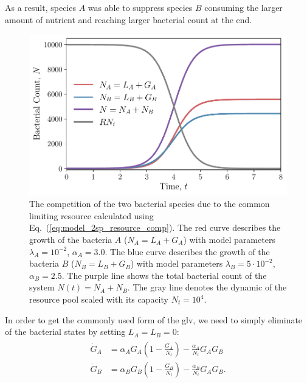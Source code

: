 \documentclass[10pt,A4paper]{article}
\numberwithin{equation}{section}
\begin{document}
As a result, species $A$ was able to suppress species $B$ consuming the larger amount of nutrient and reaching larger bacterial count at the end.
\begin{figure}
    \begin{center}
    \includegraphics[width=0.9\columnwidth]{Figures/pool_model_2pools_resource_competition.pdf}
    \caption{
        The competition of the two bacterial species due to the common limiting resource calculated using Eq.~(\ref{eq:model_2sp_resource_comp}).
        The red curve describes the growth of the bacteria $A$ ($N_A = L_A+G_A$) with model parameters $\lambda_A=10^{-2}$, $\alpha_A=3.0$.
        The blue curve describes the growth of the bacteria $B$ ($N_B = L_B+G_B$) with model parameters $\lambda_B=5\cdot 10^{-2}$, $\alpha_B=2.5$.
        The purple line shows the total bacterial count of the system  $N(t)=N_A+N_B$.
        The gray line denotes the dynamic of the resource pool scaled with its capacity $N_t=10^4$.
    }
    \label{fig:2pool_resource_2sp}
    \end{center}
\end{figure}
%
In order to get the commonly used form of the \ac{glv}, we need to simply eliminate of the bacterial states by setting $L_A=L_B=0$:
\begin{align}
    \begin{split}
        \dot{G}_A &= \alpha_A G_A\left(1 - \frac{G_A}{N_t}\right) - \frac{\alpha_A}{N_t}G_AG_B\\
        \dot{G}_B &= \alpha_B G_B\left(1-\frac{G_B}{N_t}\right) -\frac{\alpha_B}{N_t}G_AG_B. 
    \label{eq:LV_simple}
    \end{split}
\end{align}
\end{document}
